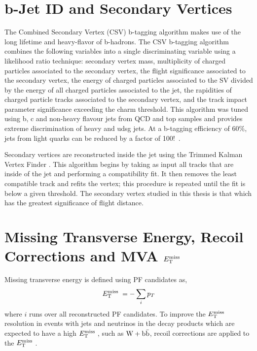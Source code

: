 \section{b-Jet ID and Secondary Vertices}
\label{sec:CSVAlgo}
The Combined Secondary Vertex (CSV) b-tagging algorithm makes use
of the long lifetime and heavy-flavor of b-hadrons.
The CSV b-tagging algorithm combines the following variables into a single discriminating
variable using a likelihood ratio technique: secondary vertex mass, multiplicity of charged
particles associated to the secondary vertex, the flight significance associated to the
secondary vertex, the energy of charged particles associated to the SV divided by the energy
of all charged particles associated to the jet, the rapidities of charged particle tracks associated
to the secondary vertex, and the track impact parameter significance exceeding the charm threshold.
This algorithm was tuned
using b, c and non-heavy flavour jets from QCD and top samples and provides extreme discrimination
of heavy and udsg jets. At a b-tagging efficiency of 60$\%$, jets from light quarks can be reduced
by a factor of 100!~\cite{refCSV}.

Secondary vertices are reconstructed inside the jet using the Trimmed Kalman Vertex Finder \cite{KalmanFilter}.
This algorithm begins by taking as input all tracks that are inside of the jet and performing a compatibility fit. It then removes the least compatible track and refits the vertex; this procedure is repeated until
the fit is below a given threshold. The secondary vertex studied in this thesis is that which has
the greatest significance of flight distance.

\section{Missing Transverse Energy, Recoil Corrections and MVA $E_\mathrm{T}^{\mathrm{miss}}\;$}
\label{sec:MET}

Missing transverse energy is defined using PF candidates as,
\begin{equation}%
\MET = -\sum_{i} p_{T}
\end{equation}
where $i$ runs over all reconstructed PF candidates. 
To improve the $E_\mathrm{T}^{\mathrm{miss}}\;$ resolution in 
events with jets and neutrinos in the decay products 
which are expected to have a high $E_\mathrm{T}^{\mathrm{miss}}\;$, such as $\mathrm{W+\mathrm{b\bar{b}}}$,
recoil corrections are applied to the $E_\mathrm{T}^{\mathrm{miss}}\;$. 

